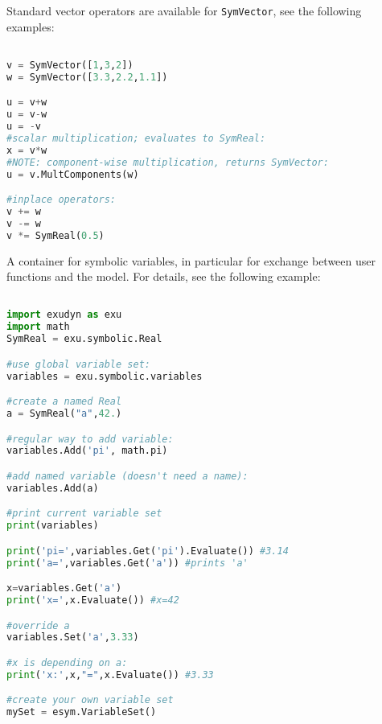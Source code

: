 Standard vector operators are available for \texttt{SymVector}, see the following examples:
\pythonstyle
\begin{lstlisting}[language=Python, firstnumber=1]

v = SymVector([1,3,2])
w = SymVector([3.3,2.2,1.1])

u = v+w
u = v-w
u = -v
#scalar multiplication; evaluates to SymReal:
x = v*w 
#NOTE: component-wise multiplication, returns SymVector:
u = v.MultComponents(w)

#inplace operators:
v += w
v -= w
v *= SymReal(0.5)
\end{lstlisting}





A container for symbolic variables, in particular for exchange between user functions and the model. For details, see the following example:
\pythonstyle
\begin{lstlisting}[language=Python, firstnumber=1]

import exudyn as exu
import math
SymReal = exu.symbolic.Real

#use global variable set:
variables = exu.symbolic.variables

#create a named Real
a = SymReal("a",42.)

#regular way to add variable:
variables.Add('pi', math.pi)

#add named variable (doesn't need a name):
variables.Add(a)

#print current variable set
print(variables)

print('pi=',variables.Get('pi').Evaluate()) #3.14
print('a=',variables.Get('a')) #prints 'a'

x=variables.Get('a')
print('x=',x.Evaluate()) #x=42

#override a
variables.Set('a',3.33)

#x is depending on a:
print('x:',x,"=",x.Evaluate()) #3.33

#create your own variable set
mySet = esym.VariableSet()
\end{lstlisting}

